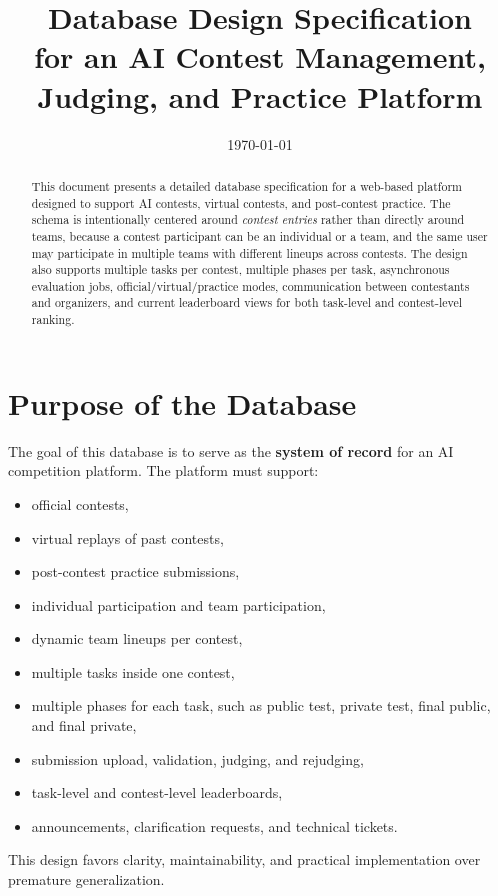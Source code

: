 \documentclass[11pt,a4paper]{article}
\title{\textbf{Database Design Specification}\\[4pt]
for an AI Contest Management, Judging, and Practice Platform}
\author{}
\date{\today}
\begin{document}
\maketitle

\begin{abstract}
This document presents a detailed database specification for a web-based platform designed to support AI contests, virtual contests, and post-contest practice. The schema is intentionally centered around \textit{contest entries} rather than directly around teams, because a contest participant can be an individual or a team, and the same user may participate in multiple teams with different lineups across contests. The design also supports multiple tasks per contest, multiple phases per task, asynchronous evaluation jobs, official/virtual/practice modes, communication between contestants and organizers, and current leaderboard views for both task-level and contest-level ranking.
\end{abstract}

\tableofcontents
\newpage

\section{Purpose of the Database}
The goal of this database is to serve as the \textbf{system of record} for an AI competition platform. The platform must support:
\begin{itemize}
    \item official contests,
    \item virtual replays of past contests,
    \item post-contest practice submissions,
    \item individual participation and team participation,
    \item dynamic team lineups per contest,
    \item multiple tasks inside one contest,
    \item multiple phases for each task, such as public test, private test, final public, and final private,
    \item submission upload, validation, judging, and rejudging,
    \item task-level and contest-level leaderboards,
    \item announcements, clarification requests, and technical tickets.
\end{itemize}

This design favors clarity, maintainability, and practical implementation over premature generalization.
\end{document}
